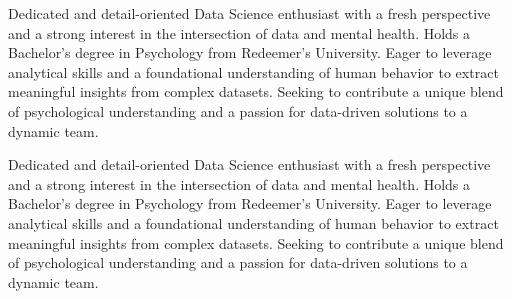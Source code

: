 \documentclass[10pt, a4paper]{cvhari}
\begin{document}
    \makecvheader
    \medskip
	
	\makecvheader
	\medskip
	
	
	
	Dedicated and detail-oriented Data Science enthusiast with a fresh perspective and a strong interest in the intersection of data and mental health. Holds a Bachelor's degree in Psychology from Redeemer's University. Eager to leverage analytical skills and a foundational understanding of human behavior to extract meaningful insights from complex datasets. Seeking to contribute a unique blend of psychological understanding and a passion for data-driven solutions to a dynamic team.
	\medskip
	
	
	\medskip
	


    Dedicated and detail-oriented Data Science enthusiast with a fresh perspective and a strong interest in the intersection of data and mental health. Holds a Bachelor's degree in Psychology from Redeemer's University. Eager to leverage analytical skills and a foundational understanding of human behavior to extract meaningful insights from complex datasets. Seeking to contribute a unique blend of psychological understanding and a passion for data-driven solutions to a dynamic team.
\end{document}
